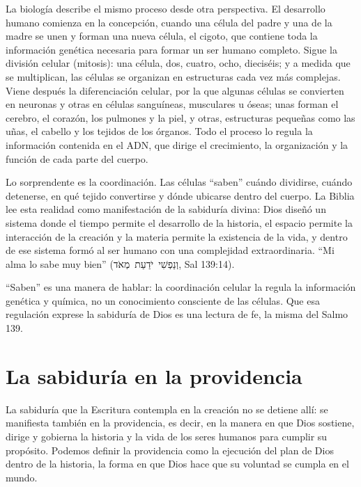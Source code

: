 \documentclass[11pt,letterpaper]{article}
\newcommand{\heb}[1]{\mbox{\foreignlanguage{hebrew}{#1}}}
\begin{document}
La biología describe el mismo proceso desde otra perspectiva. El desarrollo humano comienza en la concepción, cuando una célula del padre y una de la madre se unen y forman una nueva célula, el cigoto, que contiene toda la información genética necesaria para formar un ser humano completo. Sigue la división celular (mitosis): una célula, dos, cuatro, ocho, dieciséis; y a medida que se multiplican, las células se organizan en estructuras cada vez más complejas. Viene después la diferenciación celular, por la que algunas células se convierten en neuronas y otras en células sanguíneas, musculares u óseas; unas forman el cerebro, el corazón, los pulmones y la piel, y otras, estructuras pequeñas como las uñas, el cabello y los tejidos de los órganos. Todo el proceso lo regula la información contenida en el ADN, que dirige el crecimiento, la organización y la función de cada parte del cuerpo.

Lo sorprendente es la coordinación. Las células ``saben'' cuándo dividirse, cuándo detenerse, en qué tejido convertirse y dónde ubicarse dentro del cuerpo. La Biblia lee esta realidad como manifestación de la sabiduría divina: Dios diseñó un sistema donde el tiempo permite el desarrollo de la historia, el espacio permite la interacción de la creación y la materia permite la existencia de la vida, y dentro de ese sistema formó al ser humano con una complejidad extraordinaria. ``Mi alma lo sabe muy bien'' (\heb{וְנַפְשִׁי יֹדַעַת מְאֹד}, Sal 139:14).

\begin{nota}[Precisión]
``Saben'' es una manera de hablar: la coordinación celular la regula la información genética y química, no un conocimiento consciente de las células. Que esa regulación exprese la sabiduría de Dios es una lectura de fe, la misma del Salmo 139.
\end{nota}

\section{La sabiduría en la providencia}

La sabiduría que la Escritura contempla en la creación no se detiene allí: se manifiesta también en la providencia, es decir, en la manera en que Dios sostiene, dirige y gobierna la historia y la vida de los seres humanos para cumplir su propósito. Podemos definir la providencia como la ejecución del plan de Dios dentro de la historia, la forma en que Dios hace que su voluntad se cumpla en el mundo.
\end{document}
